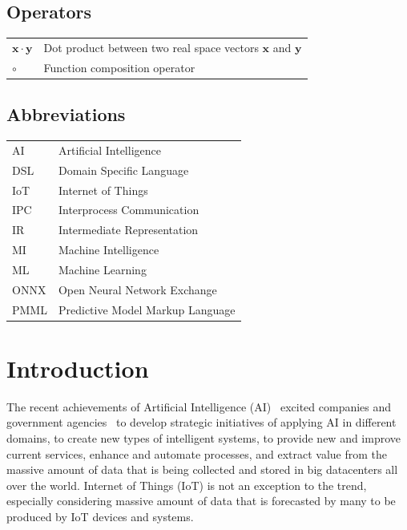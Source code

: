 \documentclass[english, 12pt, a4paper, elec, utf8, online]{aaltothesis}
\begin{document}
\subsection*{Operators}

\begin{tabular}{ll}
$\mathbf{x} \cdot \mathbf{y}$              & Dot product between two real space vectors $\mathbf{x}$ and $\mathbf{y}$\\
$\circ$ & Function composition operator  
\end{tabular}

\subsection*{Abbreviations}

\begin{tabular}{ll}
AI         & Artificial Intelligence \\   
DSL        & Domain Specific Language \\
IoT        & Internet of Things \\
IPC        & Interprocess Communication\\
IR         & Intermediate Representation \\ 
MI         & Machine Intelligence \\
ML         & Machine Learning \\
ONNX       & Open Neural Network Exchange \\
PMML       & Predictive Model Markup Language\\
\end{tabular}


\cleardoublepage

\section{Introduction}
\thispagestyle{empty}
The recent achievements of Artificial Intelligence (AI)~\cite{tan_lim_2018}  excited companies and government agencies~\cite{temreport2017} to develop strategic initiatives of applying AI in different domains, to create new types of intelligent systems, to provide new and improve current services, enhance and automate processes, and extract value from the massive amount of data that is being collected and stored in big datacenters all over the world. Internet of Things (IoT) is not an exception to the trend, especially considering massive amount of data that is forecasted by many to be produced by IoT devices and systems.
\end{document}
